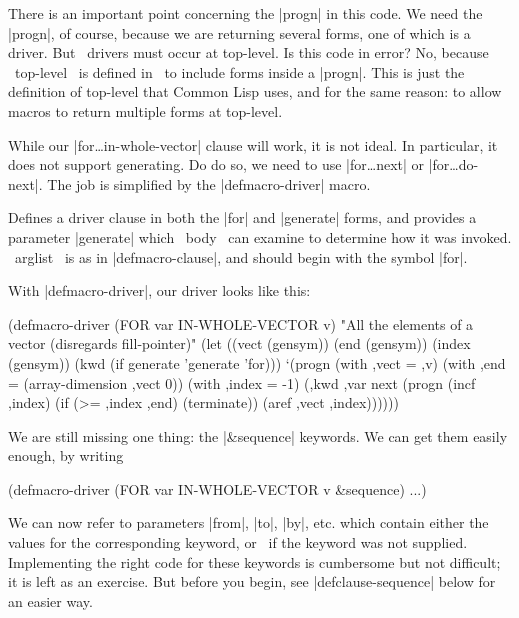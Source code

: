 There is an important point concerning the |progn| in this code.  We
need the |progn|, of course, because we are returning several forms,
one of which is a driver.  But \iter\ drivers must occur at top-level.
Is this code in error?  No, because ~top-level~ is defined in \iter\
to include forms inside a |progn|.  This is just the definition of
top-level that Common Lisp uses, and for the same reason: to allow
macros to return multiple forms at top-level.

While our |for\dots in-whole-vector| clause will work, it is not
ideal.  In particular, it does not support generating.  Do do so, we
need to use |for\dots next| or |for\dots do-next|.  The job is
simplified by the |defmacro-driver| macro.

\begin{clauses}

Defines a driver clause in
both the |for| and |generate| forms, and provides a parameter
|generate| which ~body~ can examine to determine how it was invoked.
~arglist~ is as in |defmacro-clause|, and should begin with the symbol
|for|. 

\end{clauses}

With |defmacro-driver|, our driver looks like this:
\begin{program}
(defmacro-driver (FOR var IN-WHOLE-VECTOR v)
  "All the elements of a vector (disregards fill-pointer)"
   (let ((vect (gensym))
         (end (gensym))
         (index (gensym))
         (kwd (if generate 'generate 'for)))
     `(progn
        (with ,vect = ,v)
        (with ,end = (array-dimension ,vect 0))
        (with ,index = -1)
        (,kwd ,var next (progn (incf ,index)
                               (if (>= ,index ,end) (terminate))
                               (aref ,vect ,index))))))
\end{program}


We are still missing one thing: the |\&sequence| keywords.  
We can get them easily enough, by writing 
\begin{program}
(defmacro-driver (FOR var IN-WHOLE-VECTOR v \&sequence) 
  ...)
\end{program}
We can now refer to parameters |from|, |to|, |by|, etc. which contain
either the values for the corresponding keyword, or \nil\ if the
keyword was not supplied.  Implementing the right code for these
keywords is cumbersome but not difficult; it is left as an exercise.
But before you begin, see |defclause-sequence| below for an easier way.
       

